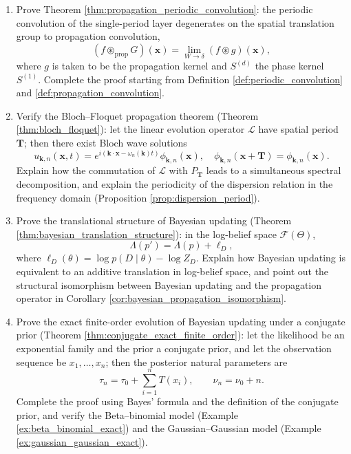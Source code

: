 \begin{enumerate}[leftmargin=3em, label=\textbf{Exercise \arabic*}]
    \item Prove Theorem \ref{thm:propagation_periodic_convolution}:
    the periodic convolution of the single-period layer degenerates on the spatial translation group to propagation convolution,
    \[
    (f\circledast_{\text{prop}}G)(\mathbf{x})
    =\lim_{W\to\delta}(f\circledast g)(\mathbf{x}),
    \]
    where $g$ is taken to be the propagation kernel and $S^{(d)}$ the phase kernel $S^{(1)}$.
    Complete the proof starting from Definition \ref{def:periodic_convolution} and \ref{def:propagation_convolution}.

    \item Verify the Bloch--Floquet propagation theorem (Theorem \ref{thm:bloch_floquet}):
    let the linear evolution operator $\mathcal{L}$ have spatial period $\mathbf{T}$;
    then there exist Bloch wave solutions
    \[
    u_{\mathbf{k},n}(\mathbf{x},t)
    =e^{i(\mathbf{k}\cdot\mathbf{x}-\omega_n(\mathbf{k})t)}\phi_{\mathbf{k},n}(\mathbf{x}),
    \quad
    \phi_{\mathbf{k},n}(\mathbf{x}+\mathbf{T})=\phi_{\mathbf{k},n}(\mathbf{x}).
    \]
    Explain how the commutation of $\mathcal{L}$ with $P_{\mathbf{T}}$ leads to a simultaneous spectral decomposition,
    and explain the periodicity of the dispersion relation in the frequency domain (Proposition \ref{prop:dispersion_period}).

    \item Prove the translational structure of Bayesian updating (Theorem \ref{thm:bayesian_translation_structure}):
    in the log-belief space $\mathcal{F}(\Theta)$,
    \[
    \Lambda(p')=\Lambda(p)+\ell_D,
    \]
    where $\ell_D(\theta)=\log p(D\mid\theta)-\log Z_D$.
    Explain how Bayesian updating is equivalent to an additive translation in log-belief space,
    and point out the structural isomorphism between Bayesian updating and the propagation operator
    in Corollary \ref{cor:bayesian_propagation_isomorphism}.

    \item Prove the exact finite-order evolution of Bayesian updating under a conjugate prior (Theorem \ref{thm:conjugate_exact_finite_order}):
    let the likelihood be an exponential family and the prior a conjugate prior, and let the observation sequence be $x_1,\dots,x_n$;
    then the posterior natural parameters are
    \[
    \tau_n=\tau_0+\sum_{i=1}^nT(x_i),\qquad
    \nu_n=\nu_0+n.
    \]
    Complete the proof using Bayes' formula and the definition of the conjugate prior,
    and verify the Beta--binomial model (Example \ref{ex:beta_binomial_exact})
    and the Gaussian--Gaussian model (Example \ref{ex:gaussian_gaussian_exact}).


\end{enumerate}

